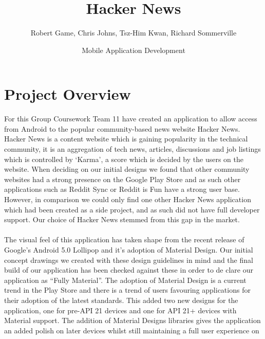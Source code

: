 \documentclass[11pt]{article}
\begin{document}
\title{Hacker News}
\author{Robert Game, Chris Johns, Tsz-Him Kwan, Richard Sommerville}
\date{Mobile Application Development}
\maketitle

\section*{Project Overview}
For this Group Coursework Team 11 have created an application to allow access from Android to the popular community-based news website Hacker News. Hacker News is a content website which is gaining popularity in the technical community, it is an aggregation of tech news, articles, discussions and job listings which is controlled by ‘Karma’, a score which is decided by the users on the website.  When deciding on our initial designs we found that other community websites had a strong presence on the Google Play Store and as such other applications such as Reddit Sync or Reddit is Fun have a strong user base. However, in comparison we could only find one other Hacker News application which had been created as a side project, and as such did not have full developer support. Our choice of Hacker News stemmed from this gap in the market.
\\
\\
The visual feel of this application has taken shape from the recent release of Google’s Android 5.0 Lollipop and it’s adoption of Material Design. Our initial concept drawings we created with these design guidelines in mind and the final build of our application has been checked against these in order to de clare our application as “Fully Material”. The adoption of Material Design is a current trend in the Play Store and there is a trend of users favouring applications for their adoption of the latest standards. This added two new designs for the application, one for pre-API 21 devices and one for API 21+ devices with Material support. The addition of Material Designs libraries gives the application an added polish on later devices whilst still maintaining a full user experience on 
\\
\\
\end{document}
